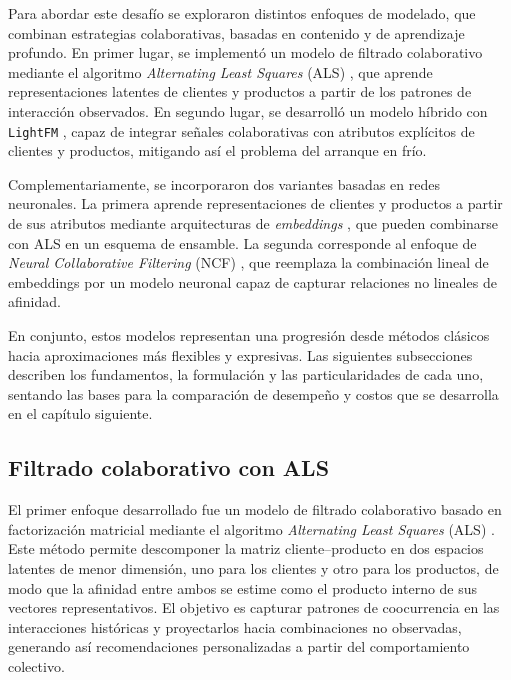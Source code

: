 Para abordar este desafío se exploraron distintos enfoques de modelado, que combinan estrategias colaborativas, basadas en contenido y de aprendizaje profundo. En primer lugar, se implementó un modelo de filtrado colaborativo mediante el algoritmo \textit{Alternating Least Squares} (ALS) \cite{ARTICLE:ALS2008, ARTICLE:Hu2008}, que aprende representaciones latentes de clientes y productos a partir de los patrones de interacción observados. En segundo lugar, se desarrolló un modelo híbrido con \texttt{LightFM} \cite{ARTICLE:LightFM2015}, capaz de integrar señales colaborativas con atributos explícitos de clientes y productos, mitigando así el problema del arranque en frío.

Complementariamente, se incorporaron dos variantes basadas en redes neuronales. La primera aprende representaciones de clientes y productos a partir de sus atributos mediante arquitecturas de \textit{embeddings} \cite{ARTICLE:Grbovic2018}, que pueden combinarse con ALS en un esquema de ensamble. La segunda corresponde al enfoque de \textit{Neural Collaborative Filtering} (NCF) \cite{ARTICLE:He2017}, que reemplaza la combinación lineal de embeddings por un modelo neuronal capaz de capturar relaciones no lineales de afinidad.

En conjunto, estos modelos representan una progresión desde métodos clásicos hacia aproximaciones más flexibles y expresivas. Las siguientes subsecciones describen los fundamentos, la formulación y las particularidades de cada uno, sentando las bases para la comparación de desempeño y costos que se desarrolla en el capítulo siguiente.

\subsection{Filtrado colaborativo con ALS}

El primer enfoque desarrollado fue un modelo de filtrado colaborativo basado en factorización matricial mediante el algoritmo \textit{Alternating Least Squares} (ALS) \cite{ARTICLE:Koren2009}. Este método permite descomponer la matriz cliente–producto en dos espacios latentes de menor dimensión, uno para los clientes y otro para los productos, de modo que la afinidad entre ambos se estime como el producto interno de sus vectores representativos. El objetivo es capturar patrones de coocurrencia en las interacciones históricas y proyectarlos hacia combinaciones no observadas, generando así recomendaciones personalizadas a partir del comportamiento colectivo.

